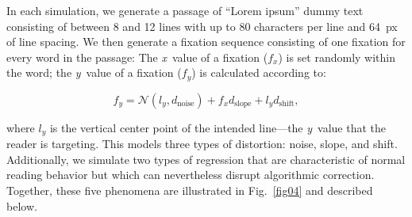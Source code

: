 \documentclass[doc,biblatex]{apa7}
\begin{document}
In each simulation, we generate a passage of ``Lorem ipsum'' dummy text consisting of between 8 and 12 lines with up to 80 characters per line and 64~px of line spacing. We then generate a fixation sequence consisting of one fixation for every word in the passage: The \textit{x}~value of a fixation ($f_x$) is set randomly within the word; the \textit{y}~value of a fixation ($f_y$) is calculated according to:

	\begin{equation}
	f_y = \mathcal{N}(l_y, d_\mathrm{noise}) + f_x d_\mathrm{slope} + l_y d_\mathrm{shift},
	\label{equation1}
	\end{equation}

\noindent where $l_y$ is the vertical center point of the intended line---the \textit{y}~value that the reader is targeting. This models three types of distortion: noise, slope, and shift. Additionally, we simulate two types of regression that are characteristic of normal reading behavior but which can nevertheless disrupt algorithmic correction. Together, these five phenomena are illustrated in Fig.~\ref{fig04} and described below.
\end{document}
